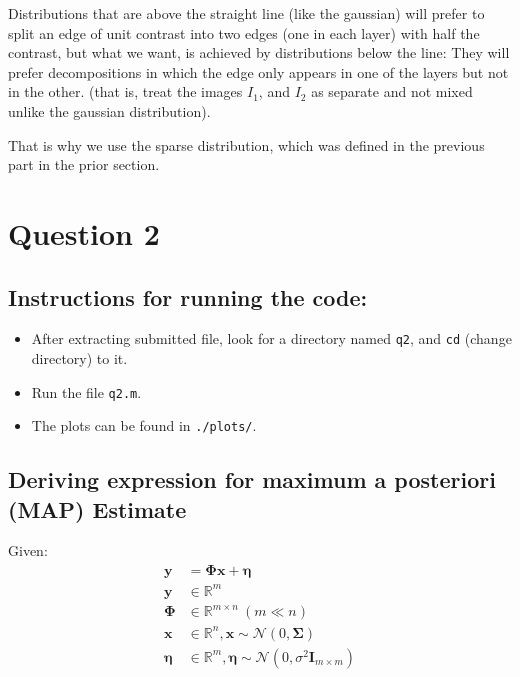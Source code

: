 \documentclass[fleqn, 11pt]{article}
\newcommand{\bs}[1]{\boldsymbol{#1}}
\begin{document}
Distributions that are above the straight line (like the gaussian) will prefer to split an edge of unit contrast
into two edges (one in each layer) with half the contrast, but what we want, is achieved by 
distributions below the line: They will prefer
decompositions in which the edge only appears in one of the layers but not in the other.
(that is, treat the images $I_1$, and $I_2$ as separate and not mixed unlike the gaussian distribution). 

That is why we use the sparse distribution, which was defined in the previous part in the prior section. 









\newpage
\section*{Question 2}
\setcounter{equation}{0}

\subsection*{Instructions for running the code:}
\begin{itemize}[noitemsep]
    \item After extracting submitted file, look for a directory named \texttt{q2}, and \texttt{cd} (change directory) to it.
    \item Run the file \texttt{q2.m}.
    \item The plots can be found in \texttt{./plots/}.
\end{itemize}

\medskip

\subsection*{Deriving expression for maximum a posteriori (MAP) Estimate}
Given:
\begin{equation*}
    \begin{aligned}
        \bs{y} &= \bs{\Phi x} + \bs{\eta} \\
        \bs{y} &\in \mathbb{R}^m \\
         \bs{\Phi} &\in \mathbb{R}^{m \times n} \ (m \ll n) \\
         \bs{x} &\in \mathbb{R}^n, \bs{x} \sim \mathcal{N}(0, \bs{\Sigma})\\
         \bs{\eta} &\in \mathbb{R}^m, \bs{\eta} \sim \mathcal{N}(0,\sigma^2\bs{I}_{m \times m}) \\
    \end{aligned}
\end{equation*}
\end{document}
